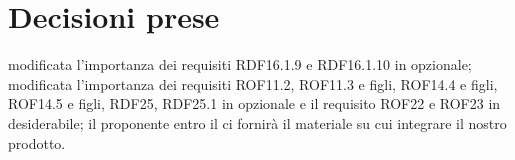 \documentclass[a4paper,11pt]{article}
\begin{document}
	\section{Decisioni prese}
	\begin{itemize}
		\itemVE modificata l'importanza dei requisiti RDF16.1.9 e RDF16.1.10 in opzionale;
		\itemVE modificata l'importanza dei requisiti ROF11.2, ROF11.3 e figli, ROF14.4 e figli, ROF14.5 e figli, RDF25, RDF25.1 in opzionale e il requisito ROF22 e ROF23 in desiderabile;
		\itemVE il proponente entro il  ci fornirà il materiale su cui integrare il nostro prodotto.
	\end{itemize}
\end{document}
